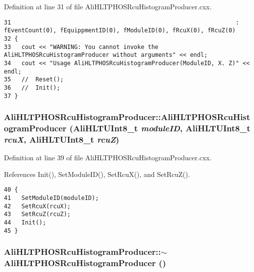 Definition at line 31 of file Ali\-HLTPHOSRcu\-Histogram\-Producer.cxx.

\footnotesize\begin{verbatim}31                                                                : fEventCount(0), fEquippmentID(0), fModuleID(0), fRcuX(0), fRcuZ(0)
32 {
33   cout << "WARNING: You cannot invoke the AliHLTPHOSRcuHistogramProducer without arguments" << endl;
34   cout << "Usage AliHLTPHOSRcuHistogramProducer(ModuleID, X. Z)" << endl;
35   //  Reset();
36   //  Init();
37 } 
\end{verbatim}\normalsize 


\subsubsection{\setlength{\rightskip}{0pt plus 5cm}Ali\-HLTPHOSRcu\-Histogram\-Producer::Ali\-HLTPHOSRcu\-Histogram\-Producer ({\bf Ali\-HLTUInt8\_\-t} {\em module\-ID}, {\bf Ali\-HLTUInt8\_\-t} {\em rcu\-X}, {\bf Ali\-HLTUInt8\_\-t} {\em rcu\-Z})}\label{classAliHLTPHOSRcuHistogramProducer_a1}




Definition at line 39 of file Ali\-HLTPHOSRcu\-Histogram\-Producer.cxx.

References Init(), Set\-Module\-ID(), Set\-Rcu\-X(), and Set\-Rcu\-Z().

\footnotesize\begin{verbatim}40 {
41   SetModuleID(moduleID);
42   SetRcuX(rcuX); 
43   SetRcuZ(rcuZ); 
44   Init();
45 }
\end{verbatim}\normalsize 


\subsubsection{\setlength{\rightskip}{0pt plus 5cm}Ali\-HLTPHOSRcu\-Histogram\-Producer::$\sim${\bf Ali\-HLTPHOSRcu\-Histogram\-Producer} ()\hspace{0.3cm}{\tt  [virtual]}}\label{classAliHLTPHOSRcuHistogramProducer_a2}




